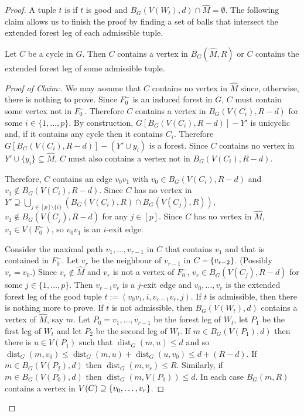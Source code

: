 \documentclass{patmorin}
\newcommand{\pat}[1]{\textcolor{Blue}{[Pat: #1]}}
\newcommand{\gwen}[1]{\textcolor{Purple}{Gwen: #1}}
\newenvironment{clmproof}{\begin{proof}[Proof of Claim:]\renewcommand{\qedsymbol}{\rule{1ex}{1ex}}}{\end{proof}}
\DeclareMathOperator{\dist}{dist}
\DeclarePairedDelimiter\set{\{}{\}}
\begin{document}
\begin{proof}
A tuple $t$ is  if $t$ is good and $B_G(V(W_t),d) \cap \widehat{M} = \emptyset$.  The following claim 
allows us to finish the proof by finding a set of balls that intersect the extended forest leg of each admissible tuple.

\begin{clm}\label{hit_cycle}
  Let $C$ be a cycle in $G$.  Then  $C$ contains a vertex in $B_G(\widehat{M},R)$ or $C$ contains the extended forest leg of some admissible tuple.
\end{clm}

\begin{clmproof}
  We may assume that $C$ contains no vertex in $\widehat{M}$ since, otherwise, there is nothing to prove.
  Since $F_0^-$ is an induced forest in $G$, $C$ must contain some vertex not in $F_0^-$.  Therefore $C$ contains a vertex in $B_G(V(C_i),R-d)$  for some $i\in\{1,\ldots,p\}$. By construction, $G[B_G(V(C_i),R-d)]-Y'$ is unicyclic and, if it contains any cycle then it contains $C_i$.  Therefore  $G[B_G(V(C_i),R-d)]-(Y'\cup y_i)$ is a forest.  Since $C$ contains no vertex in $Y'\cup\{y_i\}\subseteq \widehat{M}$, $C$ must also contains a vertex not in $B_G(V(C_i),R-d)$.

  Therefore, $C$ contains an edge $v_0v_1$ with $v_0\in B_G(V(C_i),R-d)$ and $v_1\not\in B_G(V(C_i),R-d)$.  Since $C$ has no vertex in $Y'\supseteq \bigcup_{j\in[p]\setminus\{i\}}(B_G(V(C_i),R)\cap B_G(V(C_j),R))$, $v_1\not\in B_G(V(C_j),R-d)$ for any $j\in[p]$. Since $C$ has no vertex in $\widehat{M}$, $v_1\in V(F^-_0)$, so $v_0v_1$ is an $i$-exit edge.
  
  Consider the maximal path $v_1,\ldots,v_{r-1}$ in $C$ that contains $v_1$ and that is contained in $F_0^-$. Let $v_r$ be the neighbour of $v_{r-1}$ in $C-\set{v_{r-2}}$.  (Possibly $v_r=v_0$.)  Since $v_r\notin \widehat{M}$ and $v_r$ is not a vertex of $F_0^-$, $v_r\in B_G(V(C_j),R-d)$ for some $j\in\{1,\ldots,p\}$.   Then $v_{r-1}v_r$ is a $j$-exit edge and $v_0,\ldots,v_{r}$ is the extended forest leg of the good tuple $t:=(v_0v_1,i,v_{r-1}v_r,j)$.   If $t$ is admissible, then there is nothing more to prove.  If $t$ is not admissible, 
  then $B_G(V(W_t),d)$ contains a vertex of $\widehat{M}$, say $m$.  
  Let $P_0=v_1,\ldots,v_{r-1}$ be the forest leg of $W_t$, let $P_1$ be the first leg of $W_t$ and let $P_2$ be the second leg of $W_t$. 
  If $m\in B_G(V(P_1),d)$ then there is $u\in V(P_1)$ such that $\dist_G(m,u)\leq d$ and so 
  $\dist_G(m,v_0)\le \dist_G(m,u) + \dist_G(u,v_0)\le d + (R-d)$.  
  If $m\in B_G(V(P_2),d)$ then $\dist_G(m,v_r)\le R$.  Similarly, if $m\in B_G(V(P_0),d)$ then $\dist_G(m,V(P_0))\le d$.  In each case $B_G(m,R)$ contains a vertex in $V(C)\supseteq \set{v_0,\ldots,v_r}$.
\end{clmproof}


\end{proof}
\end{document}
